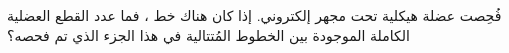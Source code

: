 
\begin{question}

\begin{instance}
  
\begin{mcq}[standalone=false]
    
\begin{stem}
      فُحِصت عضلة هيكلية تحت مجهر إلكتروني. إذا كان هناك  خط ، فما عدد القطع العضلية الكاملة الموجودة بين الخطوط  المُتتالية في هذا الجزء الذي تم فحصه؟\par    
\end{stem}
    
\begin{distractors}
        
\end{distractors}
              
\end{mcq}

\end{instance}

\end{question}
